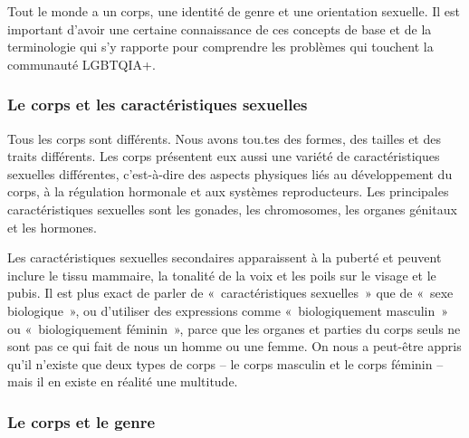 \documentclass[12pt,openany]{book}
\begin{document}
\noindent Tout le monde a un corps, une identité de genre et une orientation sexuelle. Il est important d’avoir une certaine connaissance de ces concepts de base et de la terminologie qui s’y rapporte pour comprendre les problèmes qui touchent la communauté \mbox{LGBTQIA+}.

\subsubsection*{Le corps et les caractéristiques sexuelles}

\noindent Tous les corps sont différents. Nous avons tou.tes des formes, des tailles et des traits différents. Les corps présentent eux aussi une variété de caractéristiques sexuelles différentes, c’est-à-dire des aspects physiques liés au développement du corps, à la régulation hormonale et aux systèmes reproducteurs. Les principales caractéristiques sexuelles sont les gonades, les chromosomes, les organes génitaux et les hormones.

Les caractéristiques sexuelles secondaires apparaissent à la puberté et peuvent inclure le tissu mammaire, la tonalité de la voix et les poils sur le visage et le pubis. Il est plus exact de parler de \mbox{« c}aractéristiques sexuelle\mbox{s »} que de \mbox{« s}exe biologiqu\mbox{e »}, ou d’utiliser des expressions comme \mbox{« b}iologiquement masculi\mbox{n »} ou \mbox{« b}iologiquement fémini\mbox{n »}, parce que les organes et parties du corps seuls ne sont pas ce qui fait de nous un homme ou une femme. On nous a peut-être appris qu’il n’existe que deux types de corps – le corps masculin et le corps féminin – mais il en existe en réalité une multitude.

\begin{figure}[h]
    \centering
\end{figure}

\subsubsection*{Le corps et le genre}
\end{document}
